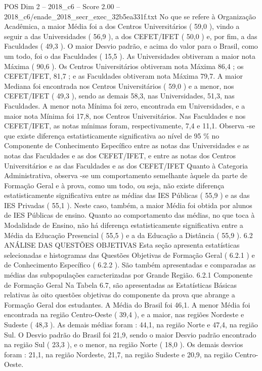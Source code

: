 \begin{textsample}{POS Dim 2 – 2018\_c6 – Score 2.00 – 2018\_c6/enade\_2018\_secr\_exec\_32b5ea331f.txt}
No que se refere à Organização Acadêmica, a maior Média foi a dos Centros Universitários ( 59,0 ), vindo a seguir a das Universidades ( 56,9 ), a dos CEFET/IFET ( 50,0 ) e, por fim, a das Faculdades ( 49,3 ).
O maior Desvio padrão, e acima do valor para o Brasil, como um todo, foi o das Faculdades ( 15,5 ).
As Universidades obtiveram a maior nota Máxima ( 90,6 ).
Os Centros Universitários obtiveram nota Máxima 86,4 ; os CEFET/IFET, 81,7 ; e as Faculdades obtiveram nota Máxima 79,7.
A maior Mediana foi encontrada nos Centros Universitários ( 59,0 ) e a menor, nos CEFET/IFET ( 49,3 ), sendo as demais 58,3, nas Universidades, 51,3, nas Faculdades.
A menor nota Mínima foi zero, encontrada em Universidades, e a maior nota Mínima foi 17,8, nos Centros Universitários.
Nas Faculdades e nos CEFET/IFET, as notas mínimas foram, respectivamente, 7,4 e 11,1.
Observa -se que existe diferença estatisticamente significativa ao nível de 95 \% no Componente de Conhecimento Específico entre as notas das Universidades e as notas das Faculdades e as dos CEFET/IFET, e entre as notas dos Centros Universitários e as das Faculdades e as dos CEFET/IFET Quanto à Categoria Administrativa, observa -se um comportamento semelhante àquele da parte de Formação Geral e à prova, como um todo, ou seja, não existe diferença estatisticamente significativa entre as médias das IES Públicas ( 55,9 ) e as das IES Privadas ( 55,1 ).
Neste caso, também, a maior Média foi obtida por alunos de IES Públicas de ensino.
Quanto ao comportamento das médias, no que toca à Modalidade de Ensino, não há diferença estatisticamente significativa entre a Média da Educação Presencial ( 55,5 ) e a da Educação a Distância ( 55,9 ). 6.2 ANÁLISE DAS QUESTÕES OBJETIVAS Esta seção apresenta estatísticas selecionadas e histogramas das Questões Objetivas de Formação Geral ( 6.2.1 ) e de Conhecimento Específico ( 6.2.2 ).
São também apresentadas e comparadas as médias das subpopulações caracterizadas por Grande Região. 6.2.1 Componente de Formação Geral Na Tabela 6.7, são apresentadas as Estatísticas Básicas relativas às oito questões objetivas do componente da prova que abrange a Formação Geral dos estudantes.
A Média do Brasil foi 46,1.
A menor Média foi encontrada na região Centro-Oeste ( 39,4 ), e a maior, nas regiões Nordeste e Sudeste ( 48,3 ).
As demais médias foram : 44,1, na região Norte e 47,4, na região Sul.
O Desvio padrão do Brasil foi 21,9, sendo o maior Desvio padrão encontrado na região Sul ( 23,3 ), e o menor, na região Norte ( 18,0 ).
Os demais desvios foram : 21,1, na região Nordeste, 21,7, na região Sudeste e 20,9, na região Centro-Oeste.

\end{textsample}

